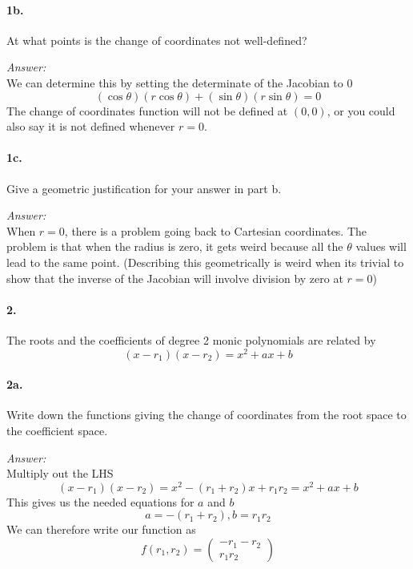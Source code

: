 \documentclass[10pt,a4paper]{article}
\begin{document}
\paragraph{1b.} At what points is the change of coordinates not well-defined?

\begin{flushleft}
\textit{Answer:}\\
We can determine this by setting the determinate of the Jacobian to 0
$$ (\cos\theta)(r\cos\theta)+(\sin\theta)(r\sin\theta) = 0$$
The change of coordinates function will not be defined at $(0,0)$, or you could also say it is not defined whenever $r=0$.
\end{flushleft}

\paragraph{1c.} Give a geometric justification for your answer in part b.
\begin{flushleft}
\textit{Answer:}\\
When $r=0$, there is a problem going back to Cartesian coordinates. The problem is that when the radius is zero, it gets weird because all the $\theta$ values will lead to the same point. (Describing this geometrically is weird when its trivial to show that the inverse of the Jacobian will involve division by zero at $r=0$)
\end{flushleft}

\paragraph{2.} The roots and the coefficients of degree 2 monic polynomials are related by
$$ (x-r_1)(x-r_2) = x^2+ax+b$$

\paragraph{2a.} Write down the functions giving the change of coordinates from the root space to the coefficient space. 
\begin{flushleft}
\textit{Answer:}\\
Multiply out the LHS
$$ (x-r_1)(x-r_2) = x^2 -(r_1+r_2)x+r_1r_2 = x^2 +ax +b$$
This gives us the needed equations for $a$ and $b$
$$ a = -(r_1+r_2), b = r_1r_2$$
We can therefore write our function as
$$f(r_1, r_2) = 
\begin{pmatrix}
-r_1-r_2\\
r_1r_2
\end{pmatrix}$$
\end{flushleft}
\end{document}
